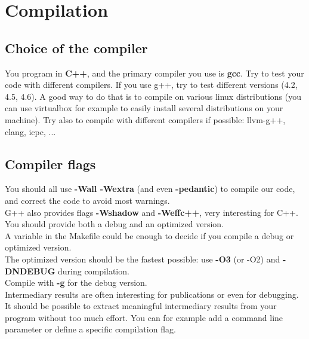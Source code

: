 \section{Compilation}

\subsection{Choice of the compiler}
You program in {\bf C++}, and the primary compiler you use is {\bf
  gcc}. Try to test your code with different compilers. If you use
g++, try to test different versions (4.2, 4.5, 4.6). A good way to do
that is to compile on various linux distributions (you can use
virtualbox for example to easily install several distributions on your
machine). Try also to compile with different compilers if possible:
llvm-g++, clang, icpc, ...

\subsection{Compiler flags}
You should all use {\bf -Wall -Wextra} (and even {\bf -pedantic}) to
compile our code, and correct the code to avoid most warnings.\\ G++
also provides flags {\bf -Wshadow} and {\bf -Weffc++}, very
interesting for C++.\\

You should provide both a debug and an optimized version.\\ A variable
in the Makefile could be enough to decide if you compile a debug or
optimized version.\\ The optimized version should be the fastest
possible: use {\bf -O3} (or -O2) and {\bf -DNDEBUG} during
compilation.\\ Compile with {\bf -g} for the debug version.\\

Intermediary results are often interesting for publications or even
for debugging. It should be possible to extract meaningful
intermediary results from your program without too much effort. You
can for example add a command line parameter or define a specific
compilation flag.
